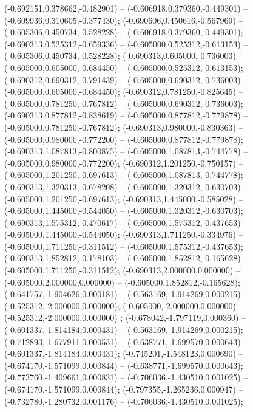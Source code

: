  (-0.692151,0.378662,-0.482901) -- (-0.606918,0.379360,-0.449301) -- (-0.609936,0.310605,-0.377430);
 (-0.690606,0.450616,-0.567969) -- (-0.605306,0.450734,-0.528228) -- (-0.606918,0.379360,-0.449301);
 (-0.690313,0.525312,-0.659336) -- (-0.605000,0.525312,-0.613153) -- (-0.605306,0.450734,-0.528228);
 (-0.690313,0.605000,-0.736003) -- (-0.605000,0.605000,-0.684450) -- (-0.605000,0.525312,-0.613153);
 (-0.690312,0.690312,-0.791439) -- (-0.605000,0.690312,-0.736003) -- (-0.605000,0.605000,-0.684450);
 (-0.690312,0.781250,-0.825645) -- (-0.605000,0.781250,-0.767812) -- (-0.605000,0.690312,-0.736003);
 (-0.690313,0.877812,-0.838619) -- (-0.605000,0.877812,-0.779878) -- (-0.605000,0.781250,-0.767812);
 (-0.690313,0.980000,-0.830363) -- (-0.605000,0.980000,-0.772200) -- (-0.605000,0.877812,-0.779878);
 (-0.690313,1.087813,-0.800875) -- (-0.605000,1.087813,-0.744778) -- (-0.605000,0.980000,-0.772200);
 (-0.690312,1.201250,-0.750157) -- (-0.605000,1.201250,-0.697613) -- (-0.605000,1.087813,-0.744778);
 (-0.690313,1.320313,-0.678208) -- (-0.605000,1.320312,-0.630703) -- (-0.605000,1.201250,-0.697613);
 (-0.690313,1.445000,-0.585028) -- (-0.605000,1.445000,-0.544050) -- (-0.605000,1.320312,-0.630703);
 (-0.690313,1.575312,-0.470617) -- (-0.605000,1.575312,-0.437653) -- (-0.605000,1.445000,-0.544050);
 (-0.690313,1.711250,-0.334976) -- (-0.605000,1.711250,-0.311512) -- (-0.605000,1.575312,-0.437653);
 (-0.690313,1.852812,-0.178103) -- (-0.605000,1.852812,-0.165628) -- (-0.605000,1.711250,-0.311512);
 (-0.690313,2.000000,0.000000) -- (-0.605000,2.000000,0.000000) -- (-0.605000,1.852812,-0.165628);
 (-0.641757,-1.904626,0.000181) -- (-0.563169,-1.914269,0.000215) -- (-0.525312,-2.000000,0.000000);
 (-0.605000,-2.000000,0.000000) -- (-0.525312,-2.000000,0.000000) ;
 (-0.678042,-1.797119,0.000360) -- (-0.601337,-1.814184,0.000431) -- (-0.563169,-1.914269,0.000215);
 (-0.712893,-1.677911,0.000531) -- (-0.638771,-1.699570,0.000643) -- (-0.601337,-1.814184,0.000431);
 (-0.745201,-1.548123,0.000690) -- (-0.674170,-1.571099,0.000844) -- (-0.638771,-1.699570,0.000643);
 (-0.773760,-1.409661,0.000831) -- (-0.706036,-1.430510,0.001025) -- (-0.674170,-1.571099,0.000844);
 (-0.797355,-1.265236,0.000947) -- (-0.732780,-1.280732,0.001176) -- (-0.706036,-1.430510,0.001025);
